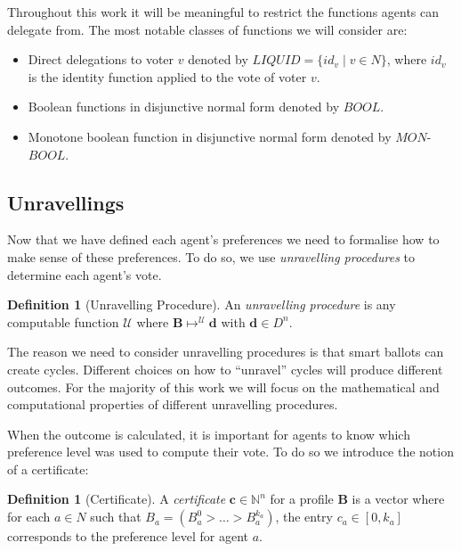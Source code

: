 \documentclass[11pt,a4paper, titlepage]{article}
\theoremstyle{definition}
\newtheorem{definition}[theorem]{Definition}
\let\vec\mathbf
\begin{document}
Throughout this work it will be meaningful to restrict the functions agents can delegate from. The most notable classes of functions we will consider are: 

\begin{itemize}
    \item Direct delegations to voter $v$ denoted by $\mathit{LIQUID} = \{\mathit{id}_v \mid v \in N\}$, where $\mathit{id}_v$ is the identity function applied to the vote of voter $v$.
    \item Boolean functions in disjunctive normal form denoted by $\mathit{BOOL}$. 
    \item Monotone boolean function in disjunctive normal form denoted by $\mathit{MON}$-$\mathit{BOOL}$.
\end{itemize}


\subsection{Unravellings}

Now that we have defined each agent's preferences we need to formalise how to make sense of these preferences. To do so, we use \emph{unravelling procedures} to determine each agent's vote.

\begin{definition}[Unravelling Procedure]
    An \emph{unravelling procedure} is any computable function $\mathcal{U}$ where $\mathbf{B} \mapsto^\mathcal{U} \vec{d}$ with $\vec{d} \in D^n$.
\end{definition}

The reason we need to consider unravelling procedures is that smart ballots can create cycles.
Different choices on how to ``unravel'' cycles will produce different outcomes.
For the majority of this work we will focus on the mathematical and computational properties of different unravelling procedures.


When the outcome is calculated, it is important for agents to know which preference level was used to compute their vote. 
To do so we introduce the notion of a certificate:

\begin{definition}[Certificate]
    A \emph{certificate} $\mathbf{c} \in \mathbb{N}^n$ for a profile $\mathbf{B}$ is a vector where for each $a \in N$ such that $B_a = (B_a^0 > \ldots > B_a^{k_a})$, the entry $c_a \in [0, k_a]$ corresponds to the preference level for agent $a$.  
\end{definition}
\end{document}
